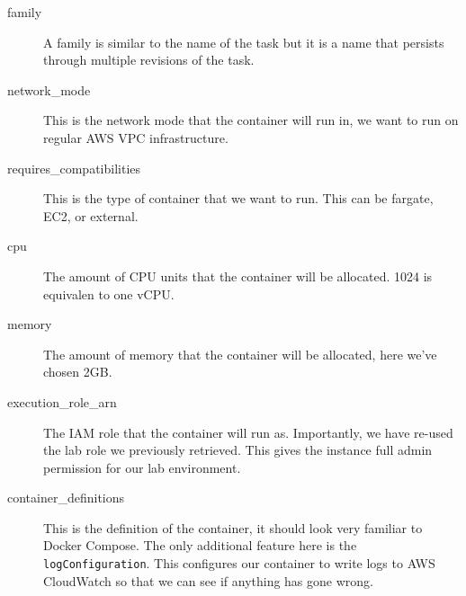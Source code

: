 \documentclass{csse4400}
\begin{document}

\begin{description}
    \item[family] A family is similar to the name of the task but it is a name that persists through multiple revisions of the task.
    \item[network\_mode] This is the network mode that the container will run in, we want to run on regular AWS VPC infrastructure.
    \item[requires\_compatibilities] This is the type of container that we want to run. This can be fargate, EC2, or external.
    \item[cpu] The amount of CPU units that the container will be allocated. 1024 is equivalen to one vCPU.
    \item[memory] The amount of memory that the container will be allocated, here we've chosen 2GB.
    \item[execution\_role\_arn] The IAM role that the container will run as.
        Importantly, we have re-used the lab role we previously retrieved.
        This gives the instance full admin permission for our lab environment.
    \item[container\_definitions] This is the definition of the container, it should look very familiar to Docker Compose.
        The only additional feature here is the \texttt{logConfiguration}.
        This configures our container to write logs to AWS CloudWatch so that we can see if anything has gone wrong.
\end{description}
\end{document}
